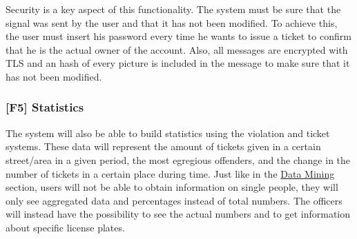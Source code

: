 Security is a key aspect of this functionality. The system must be sure that the signal was sent by the user and that it has not been modified.
To achieve this, the user must insert his password every time he wants to issue a ticket to confirm that he is the actual owner of the account.
Also, all messages are encrypted with TLS and an hash of every picture is included in the message to make sure that it has not been modified.

\subsubsection[Statistics]{[F5] Statistics\hypertarget{sec:f5}{}}
The system will also be able to build statistics using the violation and ticket systems.
These data will represent the amount of tickets given in a certain street/area in a given period, the most egregious offenders, and the change in the number of tickets in a certain place during time.
Just like in the
\hyperlink{sec:f2}{Data Mining}
section, users will not be able to obtain information on single people, they will only see aggregated data and percentages instead of total numbers.
The officers will instead have the possibility to see the actual numbers and to get information about specific license plates.
